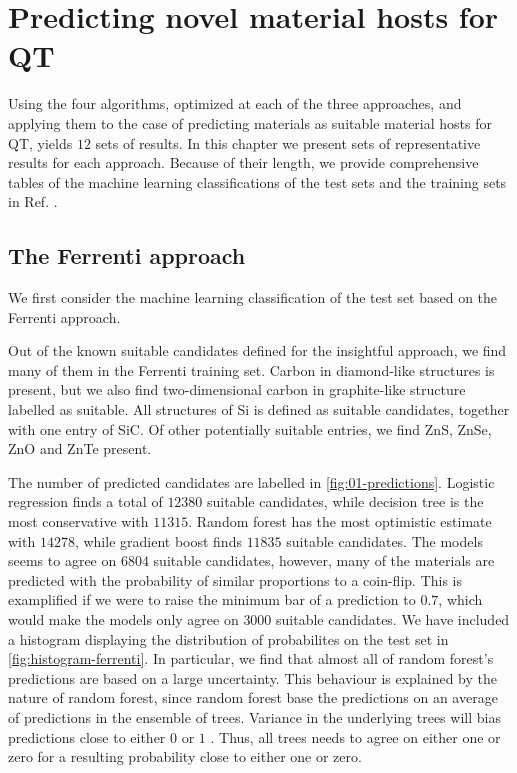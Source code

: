 \chapter{Predicting novel material hosts for QT}

Using the four algorithms, optimized at each of the three approaches, and applying them to the case of predicting materials as suitable material hosts for QT, yields $12$ sets of results. In this chapter we present sets of representative results for each approach. Because of their length, we provide comprehensive tables of the machine learning classifications of the test sets and the training sets in Ref. \cite{Ohebbi2021}.

\section{The Ferrenti approach}

We first consider the machine learning classification of the test set based on the Ferrenti approach.

Out of the known suitable candidates defined for the insightful approach, we find many of them in the Ferrenti training set. Carbon in diamond-like structures is present, but we also find two-dimensional carbon in graphite-like structure labelled as suitable. All structures of Si is defined as suitable candidates, together with one entry of SiC. Of other potentially suitable entries, we find ZnS, ZnSe, ZnO and ZnTe present.



The number of predicted candidates are labelled in \autoref{fig:01-predictions}. Logistic regression finds a total of $12380$ suitable candidates, while decision tree is the most conservative with $11315$. Random forest has the most optimistic estimate with $14278$, while gradient boost finds $11835$ suitable candidates. The models seems to agree on $6804$ suitable candidates, however, many of the materials are predicted with the probability of similar proportions to a coin-flip. This is examplified if we were to raise the minimum bar of a prediction to $0.7$, which would make the models only agree on $3000$ suitable candidates. We have included a histogram displaying the distribution of probabilites on the test set in \autoref{fig:histogram-ferrenti}. In particular, we find that almost all of random forest's predictions are based on a large uncertainty. This behaviour is explained by the nature of random forest, since random forest base the predictions on an average of predictions in the ensemble of trees. Variance in the underlying trees will bias predictions close to either $0$ or $1$ \cite{NiculescuMizil2005}. Thus, all trees needs to agree on either one or zero for a resulting probability close to either one or zero.

